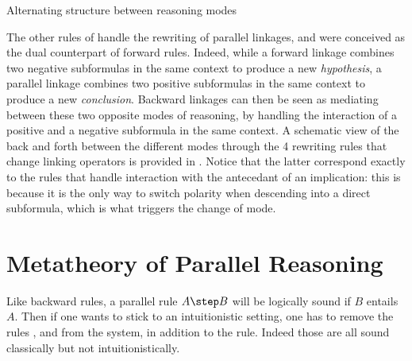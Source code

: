 \begin{marginfigure}
  \begin{center}
  \end{center}
  \caption{Alternating structure between reasoning modes}
\end{marginfigure}

The other rules of  handle the rewriting of parallel linkages,
and were conceived as the dual counterpart of forward rules. Indeed, while a
forward linkage combines two negative subformulas in the same context to produce
a new \emph{hypothesis}, a parallel linkage combines two positive subformulas in
the same context to produce a new \emph{conclusion}. Backward linkages can then
be seen as mediating between these two opposite modes of reasoning, by handling
the interaction of a positive and a negative subformula in the same context. A
schematic view of the back and forth between the different modes through the 4
rewriting rules that change linking operators is provided in
. Notice that the latter correspond exactly to the rules
that handle interaction with the antecedant of an implication: this is because
it is the only way to switch polarity when descending into a direct subformula,
which is what triggers the change of mode.

\section{Metatheory of Parallel Reasoning}

Like backward rules, a parallel rule $A \step B$ will be logically sound if $B$
entails $A$. Then if one wants to stick to an intuitionistic setting, one has to
remove the rules {}, {} and {} from the system, in addition to the {} rule. Indeed those
are all sound classically but not intuitionistically.

